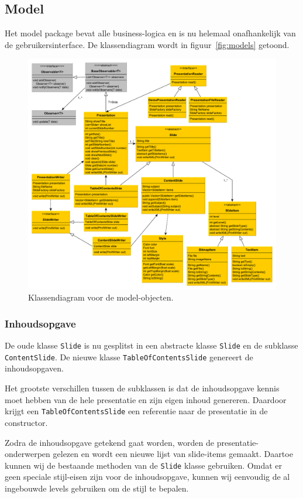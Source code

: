 \documentclass[a4paper]{article}
\newcommand{\code}[1]{\lstinline[columns=fixed]{#1}}
\begin{document}
    \subsection{Model}
	Het model package bevat alle business-logica en is nu helemaal onafhankelijk van de gebruikersinterface.
	De klassendiagram wordt in figuur~\ref{fig:models} getoond.
    \begin{figure}[!htb]
     \caption{
        Klassendiagram voor de model-objecten.\label{fig:model}
     }
     \centering \includegraphics[width=\textwidth]{Diagrams/model.pdf}
    \end{figure}
	
	
    \subsubsection{Inhoudsopgave}
    De oude klasse \code{Slide} is nu gesplitst in een abstracte klasse \code{Slide} en de subklasse \code{ContentSlide}.
    De nieuwe klasse \code{TableOfContentsSlide} genereert de inhoudsopgaven.

	Het grootste verschillen tussen de subklassen is dat de inhoudsopgave kennis moet hebben van de hele presentatie en zijn eigen inhoud genereren.
    Daardoor krijgt een \code{TableOfContentsSlide} een referentie naar de presentatie in de constructor.

    Zodra de inhoudsopgave getekend gaat worden, worden de presentatie-onder\-werpen gelezen en wordt een nieuwe lijst van slide-items gemaakt.
    Daartoe kunnen wij de bestaande methoden van de \code{Slide} klasse gebruiken.
    Omdat er geen speciale stijl-eisen zijn voor de inhoudsopgave, kunnen wij eenvoudig de al ingebouwde levels gebruiken om de stijl te bepalen.
\end{document}
